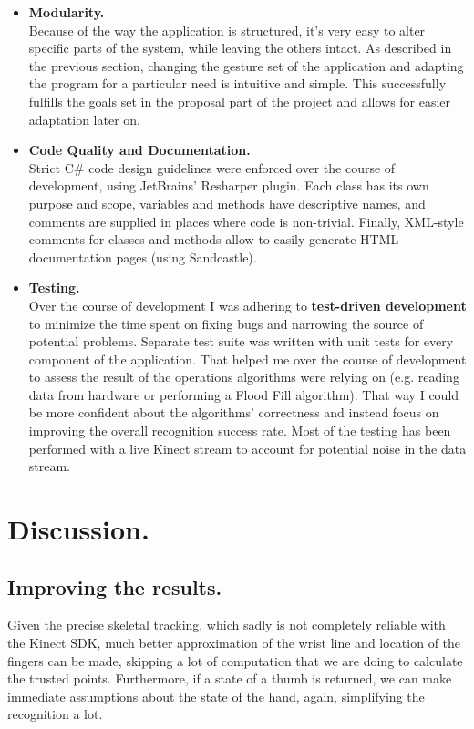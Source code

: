 \documentclass[a4paper,11pt,oneside]{article}
\begin{document}
\begin{itemize}
\item \textbf{Modularity.} \\
Because of the way the application is structured, it's very easy to alter specific parts of the system, while leaving the others intact. As described in the previous section, changing the gesture set of the application and adapting the program for a particular need is intuitive and simple. This successfully fulfills the goals set in the proposal part of the project and allows for easier adaptation later on.

  \item \textbf{Code Quality and Documentation.} \\
Strict C\# code design guidelines were enforced over the course of development, using JetBrains' Resharper plugin. Each class has its own  purpose and scope, variables and methods have descriptive names, and comments are supplied in places where code is non-trivial. Finally, XML-style comments for classes and methods allow to easily generate HTML documentation pages (using Sandcastle).

  \item \textbf{Testing.}\\ 
Over the course of development I was adhering to \textbf{test-driven development} to minimize the time spent on fixing bugs and narrowing the source of potential problems. Separate test suite was written with unit tests for every component of the application. That helped me over the course of development to assess the result of the operations algorithms were relying on (e.g. reading data from hardware or performing a Flood Fill algorithm). That way I could be more confident about the algorithms' correctness and instead focus on improving the overall recognition success rate. Most of the testing has been performed with a live Kinect stream to account for potential noise in the data stream.

  \end{itemize}

\section{Discussion.}

\subsection{Improving the results.}
Given the precise skeletal tracking, which sadly is not completely reliable with the Kinect SDK, much better approximation of the wrist line and location of the fingers can be made, skipping a lot of computation that we are doing to calculate the trusted points. Furthermore, if a state of a thumb is returned, we can make immediate assumptions about the state of the hand, again, simplifying the recognition a lot.
\end{document}
